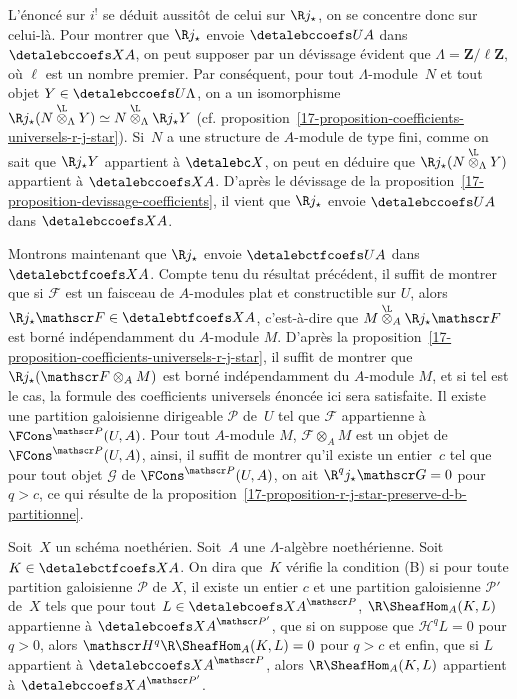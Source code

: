 \documentclass[10pt]{../fichiers-configuration-latex/smfart}
\begin{document}
L'énoncé sur $i^!$ se déduit aussitôt de celui sur $\R j_\star$, on
se concentre donc sur celui-là. Pour montrer que $\R j_\star$ envoie
$\detalebccoefs U A$ dans $\detalebccoefs X A$, on peut supposer par un dévissage
évident que $\Lambda=\mathbf{Z}/\ell\mathbf{Z}$, où $\ell$ est un nombre
premier. Par conséquent, pour tout $\Lambda$-module $N$ et tout objet
$Y\in\detalebccoefs U \Lambda$, on a un isomorphisme $\R j_\star
(N\overset{\L}\otimes_\Lambda Y)\simeq
N\overset{\L}\otimes_\Lambda \R j_\star Y$ (cf.
proposition~\ref{17-proposition-coefficients-universels-r-j-star}). Si $N$ a
une structure de $A$-module de type fini, comme on sait que $\R
j_\star Y$ appartient à $\detalebc X$, on peut en déduire que $\R j_\star
(N\overset{\L}\otimes_\Lambda Y)$ appartient à $\detalebccoefs X A$.
D'après le dévissage de la
proposition~\ref{17-proposition-devissage-coefficients}, il vient que
$\R j_\star$ envoie $\detalebccoefs U A$ dans $\detalebccoefs X A$.

Montrons maintenant que $\R j_\star$ envoie $\detalebctfcoefs U A$ dans
$\detalebctfcoefs X A$. Compte tenu du résultat précédent, il suffit de montrer
que si $\mathscr F$ est un faisceau de $A$-modules plat et constructible
sur $U$, alors $\R j_\star \mathscr F\in\detalebtfcoefs X A$,
c'est-à-dire que $M\overset{\L}\otimes_A\R j_\star \mathscr F$
est borné indépendamment du $A$-module $M$. D'après la
proposition~\ref{17-proposition-coefficients-universels-r-j-star}, il suffit
de montrer que $\R j_\star(\mathscr F\otimes_A M)$ est borné
indépendamment du $A$-module $M$, et si tel est le cas, la formule des
coefficients universels énoncée ici sera satisfaite. Il existe une
partition galoisienne dirigeable $\mathscr P$ de $U$ tel que $\mathscr F$
appartienne à $\FCons^{\mathscr P}(U,A)$. Pour tout $A$-module $M$,
$\mathscr F\otimes_A M$ est un objet de $\FCons^{\mathscr P}(U,A)$, ainsi,
il suffit de montrer qu'il existe un entier $c$ tel que pour tout objet
$\mathscr G$ de $\FCons^{\mathscr P}(U,A)$, on ait $\R^q j_\star
\mathscr G=0$ pour $q>c$, ce qui résulte de la
proposition~\ref{17-proposition-r-j-star-preserve-d-b-partitionne}.

\begin{definition2}
Soit $X$ un schéma noethérien. Soit $A$ une $\Lambda$-algèbre noethérienne.
Soit $K\in\detalebctfcoefs X A$. On dira que $K$ vérifie la condition (B) si
pour toute partition galoisienne $\mathscr P$ de $X$, il existe un entier
$c$ et une partition galoisienne $\mathscr P'$ de $X$ tels que pour
tout $L\in{\detalebcoefs X A}^{\mathscr P}$, $\R\SheafHom_A(K,L)$
appartienne à ${\detalebcoefs X A}^{\mathscr P'}$, que si on suppose que
$\mathscr H^qL=0$ pour $q>0$, alors 
$\mathscr H^q\R\SheafHom_A(K,L)=0$ pour $q>c$ et enfin, que si $L$
appartient à ${\detalebccoefs X A}^{\mathscr P}$, alors
$\R\SheafHom_A(K,L)$ appartient à ${\detalebccoefs X A}^{\mathscr P'}$.
\end{definition2}
\end{document}
